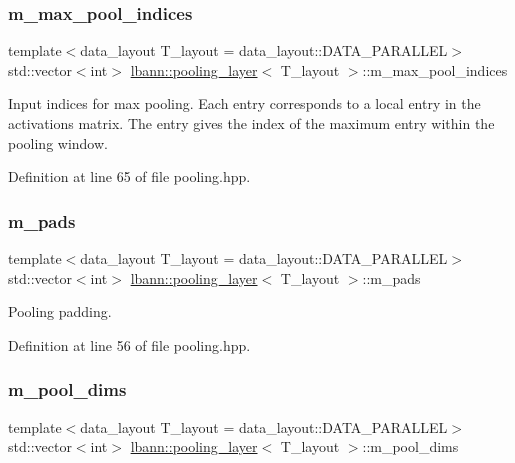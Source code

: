 \subsubsection{\texorpdfstring{m\+\_\+max\+\_\+pool\+\_\+indices}{m\_max\_pool\_indices}}
{\footnotesize\ttfamily template$<$data\+\_\+layout T\+\_\+layout = data\+\_\+layout\+::\+D\+A\+T\+A\+\_\+\+P\+A\+R\+A\+L\+L\+EL$>$ \\
std\+::vector$<$int$>$ \hyperlink{classlbann_1_1pooling__layer}{lbann\+::pooling\+\_\+layer}$<$ T\+\_\+layout $>$\+::m\+\_\+max\+\_\+pool\+\_\+indices\hspace{0.3cm}{\ttfamily [private]}}

Input indices for max pooling. Each entry corresponds to a local entry in the activations matrix. The entry gives the index of the maximum entry within the pooling window. 

Definition at line 65 of file pooling.\+hpp.

\mbox{\label{classlbann_1_1pooling__layer_a22fd39aa4358149110a369ddf0e5ffdb}} 
\subsubsection{\texorpdfstring{m\+\_\+pads}{m\_pads}}
{\footnotesize\ttfamily template$<$data\+\_\+layout T\+\_\+layout = data\+\_\+layout\+::\+D\+A\+T\+A\+\_\+\+P\+A\+R\+A\+L\+L\+EL$>$ \\
std\+::vector$<$int$>$ \hyperlink{classlbann_1_1pooling__layer}{lbann\+::pooling\+\_\+layer}$<$ T\+\_\+layout $>$\+::m\+\_\+pads\hspace{0.3cm}{\ttfamily [private]}}



Pooling padding. 



Definition at line 56 of file pooling.\+hpp.

\mbox{\label{classlbann_1_1pooling__layer_abb52fe974f602921823a46320fd7d075}} 
\subsubsection{\texorpdfstring{m\+\_\+pool\+\_\+dims}{m\_pool\_dims}}
{\footnotesize\ttfamily template$<$data\+\_\+layout T\+\_\+layout = data\+\_\+layout\+::\+D\+A\+T\+A\+\_\+\+P\+A\+R\+A\+L\+L\+EL$>$ \\
std\+::vector$<$int$>$ \hyperlink{classlbann_1_1pooling__layer}{lbann\+::pooling\+\_\+layer}$<$ T\+\_\+layout $>$\+::m\+\_\+pool\+\_\+dims\hspace{0.3cm}{\ttfamily [private]}}



